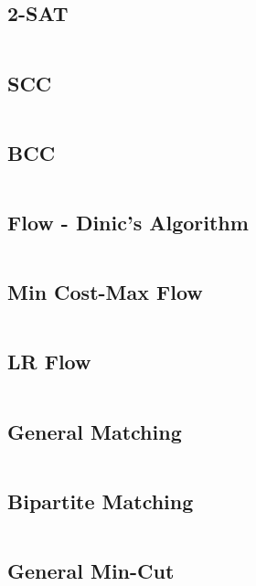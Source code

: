 \subsection{2-SAT} %
\inputminted{cpp}{src/Graphs/2sat.cpp}

\subsection{SCC} %
\inputminted{cpp}{src/Graphs/scc-tarjan.cpp}

\subsection{BCC} %
\inputminted{cpp}{src/Graphs/bcc.cpp}

\subsection{Flow - Dinic's Algorithm} %
\inputminted{cpp}{src/Graphs/dinic.cpp}

\subsection{Min Cost-Max Flow} %
\inputminted{cpp}{src/Graphs/mcmf.cpp}


\subsection{LR Flow} %
\inputminted{cpp}{src/Graphs/lrflow.cpp}

\subsection{General Matching} %
\inputminted{cpp}{src/Graphs/blossom.cpp}

\subsection{Bipartite Matching} %
\inputminted{cpp}{src/Graphs/bipartite.cpp}

\subsection{General Min-Cut} %
\inputminted{cpp}{src/Graphs/mincut.cpp}